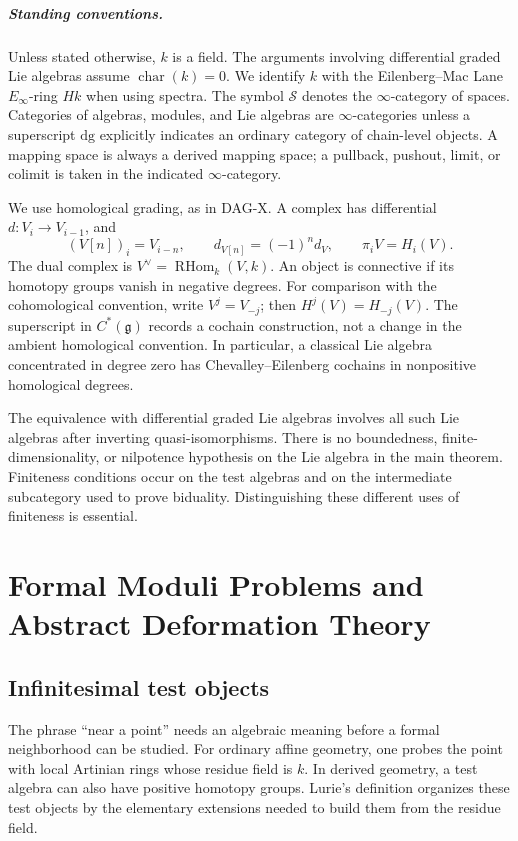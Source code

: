 \documentclass[12pt,letterpaper,oneside]{report}
\theoremstyle{definition}
\theoremstyle{remark}
\newcommand{\cS}{\mathcal S}
\newcommand{\RHom}{\operatorname{RHom}}
\newcommand{\dg}{\mathrm{dg}}
\newcommand{\g}{\mathfrak g}
\begin{document}
\paragraph{Standing conventions.}
Unless stated otherwise, $k$ is a field. The arguments involving differential graded Lie algebras assume $\operatorname{char}(k)=0$. We identify $k$ with the Eilenberg--Mac Lane $E_\infty$-ring $Hk$ when using spectra. The symbol $\cS$ denotes the $\infty$-category of spaces. Categories of algebras, modules, and Lie algebras are $\infty$-categories unless a superscript $\dg$ explicitly indicates an ordinary category of chain-level objects. A mapping space is always a derived mapping space; a pullback, pushout, limit, or colimit is taken in the indicated $\infty$-category.

We use homological grading, as in DAG-X. A complex has differential $d:V_i\to V_{i-1}$, and
\[
 (V[n])_i=V_{i-n},\qquad d_{V[n]}=(-1)^n d_V,
 \qquad \pi_i V=H_i(V).
\]
The dual complex is $V^\vee=\RHom_k(V,k)$. An object is connective if its homotopy groups vanish in negative degrees. For comparison with the cohomological convention, write $V^j=V_{-j}$; then $H^j(V)=H_{-j}(V)$. The superscript in $C^*(\g)$ records a cochain construction, not a change in the ambient homological convention. In particular, a classical Lie algebra concentrated in degree zero has Chevalley--Eilenberg cochains in nonpositive homological degrees.

The equivalence with differential graded Lie algebras involves all such Lie algebras after inverting quasi-isomorphisms. There is no boundedness, finite-dimensionality, or nilpotence hypothesis on the Lie algebra in the main theorem. Finiteness conditions occur on the test algebras and on the intermediate subcategory used to prove biduality. Distinguishing these different uses of finiteness is essential.

\chapter{Formal Moduli Problems and Abstract Deformation Theory}
\label{ch:abstract}
\section{Infinitesimal test objects}
\label{sec:small}

The phrase ``near a point'' needs an algebraic meaning before a formal neighborhood can be studied. For ordinary affine geometry, one probes the point with local Artinian rings whose residue field is $k$. In derived geometry, a test algebra can also have positive homotopy groups. Lurie's definition organizes these test objects by the elementary extensions needed to build them from the residue field.
\end{document}
